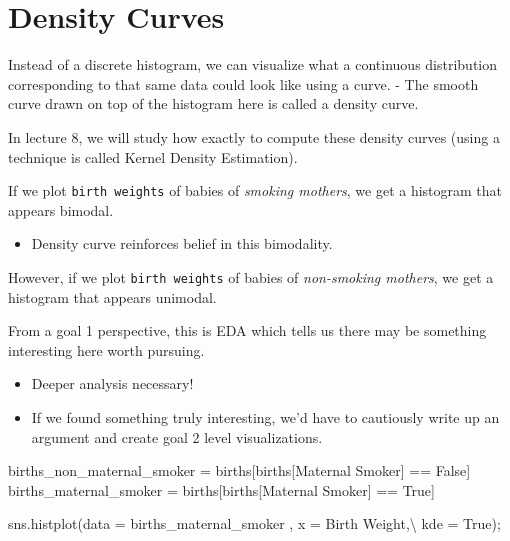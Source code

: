 \documentclass[
  letterpaper,
  DIV=11,
  numbers=noendperiod]{scrreprt}
\newenvironment{Shaded}{\begin{snugshade}}{\end{snugshade}}
\newcommand{\NormalTok}[1]{\textcolor[rgb]{0.00,0.23,0.31}{#1}}
\newcommand{\OperatorTok}[1]{\textcolor[rgb]{0.37,0.37,0.37}{#1}}
\newcommand{\StringTok}[1]{\textcolor[rgb]{0.13,0.47,0.30}{#1}}
\newcommand{\VariableTok}[1]{\textcolor[rgb]{0.07,0.07,0.07}{#1}}
\providecommand{\tightlist}{%
  \setlength{\itemsep}{0pt}\setlength{\parskip}{0pt}}\usepackage{longtable,booktabs,array}
\begin{document}
\hypertarget{density-curves}{%
\section{Density Curves}\label{density-curves}}

Instead of a discrete histogram, we can visualize what a continuous
distribution corresponding to that same data could look like using a
curve. - The smooth curve drawn on top of the histogram here is called a
density curve.

In lecture 8, we will study how exactly to compute these density curves
(using a technique is called Kernel Density Estimation).

If we plot \texttt{birth\ weights} of babies of \emph{smoking mothers},
we get a histogram that appears bimodal.

\begin{itemize}
\tightlist
\item
  Density curve reinforces belief in this bimodality.
\end{itemize}

However, if we plot \texttt{birth\ weights} of babies of
\emph{non-smoking mothers}, we get a histogram that appears unimodal.

From a goal 1 perspective, this is EDA which tells us there may be
something interesting here worth pursuing.

\begin{itemize}
\tightlist
\item
  Deeper analysis necessary!
\item
  If we found something truly interesting, we'd have to cautiously write
  up an argument and create goal 2 level visualizations.
\end{itemize}

\begin{Shaded}
\begin{Highlighting}[]
\NormalTok{births\_non\_maternal\_smoker }\OperatorTok{=}\NormalTok{ births[births[}\StringTok{\textquotesingle{}Maternal Smoker\textquotesingle{}}\NormalTok{] }\OperatorTok{==} \VariableTok{False}\NormalTok{]}
\NormalTok{births\_maternal\_smoker }\OperatorTok{=}\NormalTok{ births[births[}\StringTok{\textquotesingle{}Maternal Smoker\textquotesingle{}}\NormalTok{] }\OperatorTok{==} \VariableTok{True}\NormalTok{]}
 
\NormalTok{sns.histplot(data }\OperatorTok{=}\NormalTok{ births\_maternal\_smoker , x }\OperatorTok{=} \StringTok{\textquotesingle{}Birth Weight\textquotesingle{}}\NormalTok{,}\OperatorTok{\textbackslash{}}
\NormalTok{             kde }\OperatorTok{=} \VariableTok{True}\NormalTok{)}\OperatorTok{;}
\end{Highlighting}
\end{Shaded}
\end{document}
